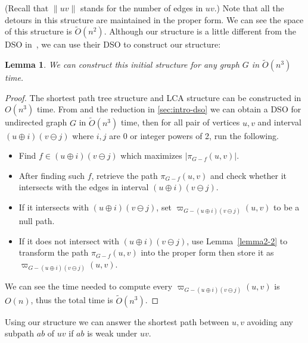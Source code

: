 \documentclass[11pt]{article}
\theoremstyle{plain}
\newtheorem{lemma}[theorem]{Lemma}
\theoremstyle{definition}
\newcommand{\too}[1]{\tilde{O}({#1})}
\newcommand{\og}[3]{\pi_{G-#3}\left(#1,#2\right)}
\newcommand{\odg}[3]{\varpi_{G-#3}\left(#1,#2\right)}
\begin{document}
(Recall that $\|uv\|$ stands for the number of edges in $uv$.) Note that all the detours in this structure are maintained in the proper form. We can see the space of this structure is $\tilde{O}(n^2)$.
Although our structure is a little different from the DSO in~\cite{2009A}, we can use their DSO to construct our structure:

\begin{lemma}
    We can construct this initial structure for any graph $G$ in $\too{n^3}$ time.
\end{lemma}

\begin{proof}
The shortest path tree structure and LCA structure can be constructed in $O(n^3)$ time. From \cite{2009A} and the reduction in \cref{sec:intro-dso} we can obtain a DSO for undirected graph $G$ in $\too{n^3}$ time, then for all pair of vertices $u,v$ and interval $(u \oplus i)(v \ominus j)$ where $i, j$ are 0 or integer powers of 2, run the following.


\begin{itemize}
    \item Find $f \in (u \oplus i)(v \ominus j)$ which maximizes $|\og{u}{v}{f}|$.
    \item After finding such $f$, retrieve the path $\og{u}{v}{f}$ and check whether it intersects with the edges in interval $(u \oplus i)(v \ominus j)$. 
    \item If it intersects with $(u \oplus i)(v \ominus j)$, set $\odg{u}{v}{(u \oplus i)(v \ominus j)}$ to be a null path.
    \item If it does not intersect with $(u \oplus i)(v \ominus j)$, use Lemma~\ref{lemma2-2} to transform the path $\og{u}{v}{f}$ into the proper form then store it as $\odg{u}{v}{(u \oplus i)(v \ominus j)}$.
\end{itemize}

We can see the time needed to compute every $\odg{u}{v}{(u \oplus i)(v \ominus j)}$ is $O(n)$, thus the total time is $\tilde{O}(n^3)$.







\end{proof}


Using our structure we can answer the shortest path between $u,v$ avoiding any subpath $ab$ of $uv$ if $ab$ is weak under $uv$.
\end{document}
